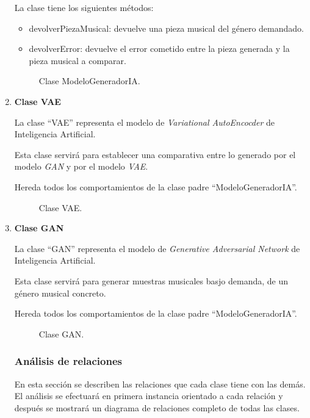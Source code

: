 \begin{enumerate}
  La clase tiene los siguientes métodos:

  \begin{itemize}
      \item devolverPiezaMusical: devuelve una pieza musical del género demandado.
      \item devolverError: devuelve el error cometido entre la pieza generada y la pieza musical a comparar.
  \end{itemize}

  \begin{figure}[H]
    \centering
    
    \caption{Clase ModeloGeneradorIA.}
  \end{figure}


  \item \textbf{Clase VAE}

  La clase ``VAE'' representa el modelo de \emph{Variational AutoEncocder} de Inteligencia Artificial.

  Esta clase servirá para establecer una comparativa entre lo generado por el modelo \emph{GAN} y por el modelo \emph{VAE}.

  Hereda todos los comportamientos de la clase padre ``ModeloGeneradorIA''.

  \begin{figure}[H]
    \centering
    
    \caption{Clase VAE.}
  \end{figure}

  \item \textbf{Clase GAN}

  La clase ``GAN'' representa el modelo de \emph{Generative Adversarial Network} de Inteligencia Artificial.

  Esta clase servirá para generar muestras musicales basjo demanda, de un género musical concreto.

  Hereda todos los comportamientos de la clase padre ``ModeloGeneradorIA''.

  \begin{figure}[H]
    \centering
    
    \caption{Clase GAN.}
  \end{figure}

  \subsubsection{Análisis de relaciones}

  En esta sección se describen las relaciones que cada clase tiene con las demás. El análisis se efectuará en primera instancia orientado a cada relación y después se mostrará un diagrama de relaciones completo de todas las clases.


\end{enumerate}

